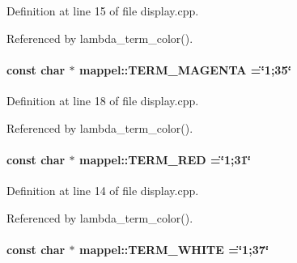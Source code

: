 Definition at line 15 of file display.\+cpp.



Referenced by lambda\+\_\+term\+\_\+color().

\paragraph[{\texorpdfstring{T\+E\+R\+M\+\_\+\+M\+A\+G\+E\+N\+TA}{TERM_MAGENTA}}]{\setlength{\rightskip}{0pt plus 5cm}const char $\ast$ mappel\+::\+T\+E\+R\+M\+\_\+\+M\+A\+G\+E\+N\+TA =\char`\"{}1;35\char`\"{}}\hypertarget{namespacemappel_a2b80f7559dbf8fd1650220f75db541b2}{}\label{namespacemappel_a2b80f7559dbf8fd1650220f75db541b2}


Definition at line 18 of file display.\+cpp.



Referenced by lambda\+\_\+term\+\_\+color().

\paragraph[{\texorpdfstring{T\+E\+R\+M\+\_\+\+R\+ED}{TERM_RED}}]{\setlength{\rightskip}{0pt plus 5cm}const char $\ast$ mappel\+::\+T\+E\+R\+M\+\_\+\+R\+ED =\char`\"{}1;31\char`\"{}}\hypertarget{namespacemappel_ab22998f4999661d300fe1f1e2bc615a2}{}\label{namespacemappel_ab22998f4999661d300fe1f1e2bc615a2}


Definition at line 14 of file display.\+cpp.



Referenced by lambda\+\_\+term\+\_\+color().

\paragraph[{\texorpdfstring{T\+E\+R\+M\+\_\+\+W\+H\+I\+TE}{TERM_WHITE}}]{\setlength{\rightskip}{0pt plus 5cm}const char $\ast$ mappel\+::\+T\+E\+R\+M\+\_\+\+W\+H\+I\+TE =\char`\"{}1;37\char`\"{}}\hypertarget{namespacemappel_aa0d4a391df8c98076fb8d02fe34ce24c}{}\label{namespacemappel_aa0d4a391df8c98076fb8d02fe34ce24c}



